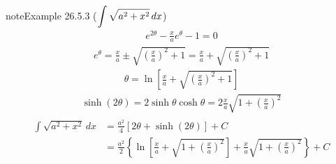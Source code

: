 \documentclass[letterpaper,10pt,italian]{jupyterBook}
\begin{document}
\begin{sphinxadmonition}{note}{Example 26.5.3 (\protect\( \displaystyle \int \sqrt{a^2 + x^2} \,  dx\protect\))}
\begin{equation*}
\end{equation*}\begin{equation*}
\begin{split}e^{2 \theta} - \frac{x}{a} e^{\theta} - 1 = 0\end{split}
\end{equation*}\begin{equation*}
\begin{split}e^{\theta} 
  = \frac{x}{a} \pm \sqrt{\left( \frac{x}{a} \right)^2 + 1}
  = \frac{x}{a}  +  \sqrt{\left( \frac{x}{a} \right)^2 + 1}
\end{split}
\end{equation*}\begin{equation*}
\begin{split}\theta = \ln \left[ \frac{x}{a}  +  \sqrt{\left( \frac{x}{a} \right)^2 + 1} \right]\end{split}
\end{equation*}\begin{equation*}
\begin{split}\sinh (2 \theta) = 2 \sinh \theta \cosh \theta = 2 \frac{x}{a} \sqrt{1 + \left(\frac{x}{a}\right)^2}\end{split}
\end{equation*}\begin{equation*}
\begin{split}\begin{aligned}
  \int \sqrt{a^2 + x^2} \, dx
   & = \frac{a^2}{4} \left[ 2 \theta + \sinh \left( 2 \theta \right) \right] + C \\
   & = \frac{a^2}{2} \left\{ \ln \left[ \frac{x}{a}  +  \sqrt{1 + \left( \frac{x}{a} \right)^2} \right] + \frac{x}{a} \sqrt{1 + \left(\frac{x}{a}\right)^2} \right\} + C
\end{aligned}\end{split}
\end{equation*}\end{sphinxadmonition}
\label{ch/infinitesimal_calculus/integrals:integrals-methods-3}
\end{document}
